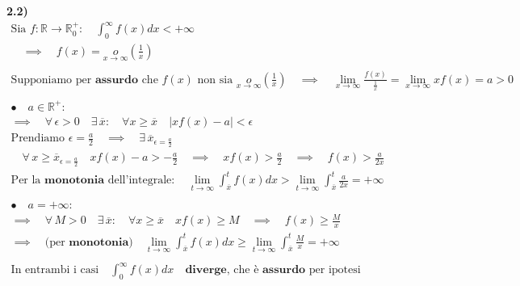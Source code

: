 \documentclass[11pt,reqno]{amsart}
\begin{document}
{\bf 2.2)}
\begin{gather*}
 \text{Sia } f:\mathbb{R}\to\mathbb{R}_0^{+}: \quad \int_{0}^{\infty} f(x) dx < +\infty\\
 \quad \implies \quad f(x) = \underset{x \to \infty}{o}\left(\frac{1}{x}\right)\\\\
 \text{Supponiamo per } \textbf{assurdo} \text{ che } f(x) \text{ non sia } \underset{x \to \infty}{o}\left(\frac{1}{x}\right) \quad \implies \quad \lim_{x \to \infty} \frac{f(x)}{\frac{1}{x}} = \lim_{x \to \infty} xf(x) = a > 0\\\\
 \bullet \quad a \in \mathbb{R}^{+}:\\
 \implies \quad \forall \, \epsilon > 0 \quad \exists \, \overline{x}: \quad \forall x \geq \overline{x} \quad |xf(x) - a| < \epsilon\\
 \text{Prendiamo } \epsilon = \frac{a}{2} \quad \implies \quad \exists \, \overline{x}_{\epsilon = \frac{a}{2}}\\
 \quad \forall \, x \geq \overline{x}_{\epsilon = \frac{a}{2}} \quad xf(x) - a > -\frac{a}{2} \quad \implies \quad xf(x) > \frac{a}{2} \quad \implies \quad f(x) > \frac{a}{2x}\\
 \text{Per la } \textbf{monotonia} \text{ dell'integrale}: \quad \lim_{t \to \infty} \int_{\overline{x}}^{t} f(x) dx > \lim_{t \to \infty} \int_{\overline{x}}^{t} \frac{a}{2x} = +\infty\\\\
 \bullet \quad a = +\infty:\\
 \implies \quad \forall \, M > 0 \quad \exists \, \overline{x}: \quad \forall x \geq \overline{x} \quad xf(x) \geq M \quad\implies \quad f(x) \geq \frac{M}{x}\\
 \implies \quad \text{(per } \textbf{monotonia} \text{)} \quad \lim_{t \to \infty} \int_{\overline{x}}^{t} f(x) dx \geq \lim_{t \to \infty} \int_{\overline{x}}^{t} \frac{M}{x} = +\infty\\\\
 \text{In entrambi i casi} \quad \int_{0}^{\infty} f(x) dx \quad \textbf{diverge} \text{, che è } \textbf{assurdo} \text{ per ipotesi}
\end{gather*}
\fi
\end{document}
